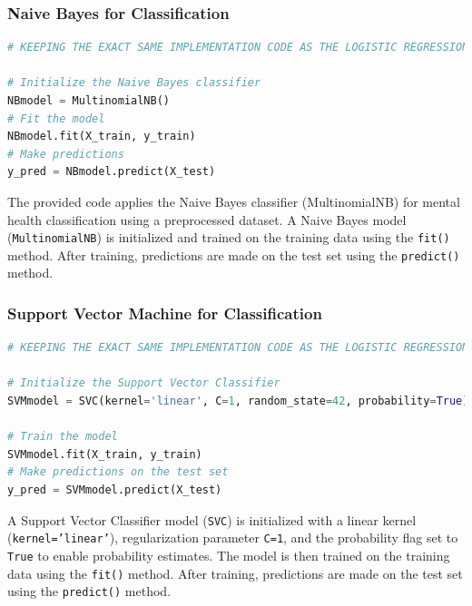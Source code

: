 
\subsubsection{Naive Bayes for Classification}

\begin{tcolorbox}[colback=gray!5!white, colframe=gray!80!black, boxrule=0.5pt, title=Naive Bayes for Mental Health Classification]
    \begin{lstlisting}[language=Python]
# KEEPING THE EXACT SAME IMPLEMENTATION CODE AS THE LOGISTIC REGRESSION

# Initialize the Naive Bayes classifier
NBmodel = MultinomialNB()
# Fit the model
NBmodel.fit(X_train, y_train)
# Make predictions
y_pred = NBmodel.predict(X_test)

    \end{lstlisting}
\end{tcolorbox}

\noindent
The provided code applies the Naive Bayes classifier (MultinomialNB) for mental health classification using a preprocessed dataset. A Naive Bayes model (\texttt{MultinomialNB}) is initialized and trained on the training data using the \texttt{fit()} method. After training, predictions are made on the test set using the \texttt{predict()} method.


\subsubsection{Support Vector Machine for Classification}

\begin{tcolorbox}[colback=gray!5!white, colframe=gray!80!black, boxrule=0.5pt, title=Support Vector Classifier Implementation]
    \begin{lstlisting}[language=Python]
# KEEPING THE EXACT SAME IMPLEMENTATION CODE AS THE LOGISTIC REGRESSION

# Initialize the Support Vector Classifier
SVMmodel = SVC(kernel='linear', C=1, random_state=42, probability=True)  # You can adjust parameters as needed

# Train the model
SVMmodel.fit(X_train, y_train)
# Make predictions on the test set
y_pred = SVMmodel.predict(X_test)
\end{lstlisting}
\end{tcolorbox}

\noindent
 A Support Vector Classifier model (\texttt{SVC}) is initialized with a linear kernel (\texttt{kernel='linear'}), regularization parameter \texttt{C=1}, and the probability flag set to \texttt{True} to enable probability estimates. The model is then trained on the training data using the \texttt{fit()} method. After training, predictions are made on the test set using the \texttt{predict()} method. 

